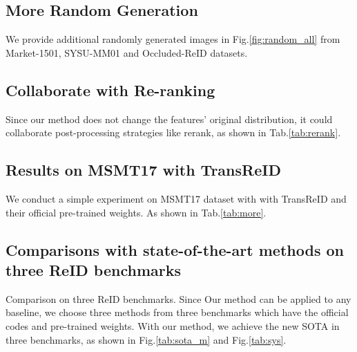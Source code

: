 \subsection{More Random Generation}
We provide additional randomly generated images in Fig.\ref{fig:random_all} from Market-1501, SYSU-MM01 and Occluded-ReID datasets.


\subsection{Collaborate with Re-ranking}
Since our method does not change the features' original distribution,
it could collaborate post-processing strategies like rerank, as shown in Tab.\ref{tab:rerank}.

\subsection{Results on MSMT17 with TransReID}
We conduct a simple experiment on MSMT17 dataset with with TransReID and their official pre-trained weights. As shown in Tab.\ref{tab:more}.

\subsection{Comparisons with state-of-the-art methods on three ReID benchmarks}
Comparison on three ReID benchmarks. Since Our method can be applied to any baseline, we choose three methods from three benchmarks which have the official codes and pre-trained weights. With our method, we achieve the new SOTA in three benchmarks, as shown in Fig.\ref{tab:sota_m} and Fig.\ref{tab:sys}.



